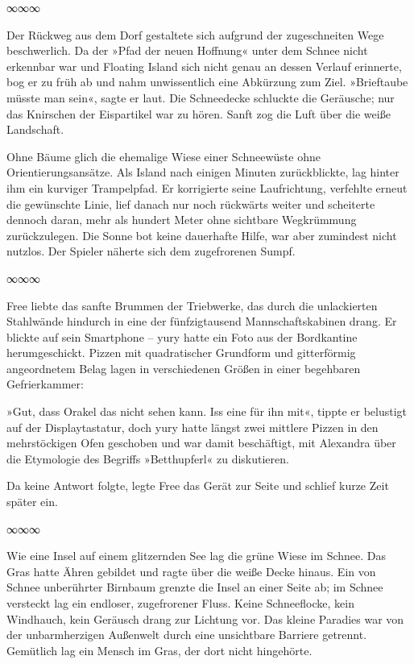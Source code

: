 \begin{center}
	∞∞∞
\end{center}

Der Rückweg aus dem Dorf gestaltete sich aufgrund der zugeschneiten Wege beschwerlich. Da der »Pfad der neuen Hoffnung« unter dem Schnee nicht erkennbar war und Floating Island sich nicht genau an dessen Verlauf erinnerte, bog er zu früh ab und nahm unwissentlich eine Abkürzung zum Ziel. »Brieftaube müsste man sein«, sagte er laut. Die Schneedecke schluckte die Geräusche; nur das Knirschen der Eispartikel war zu hören. Sanft zog die Luft über die weiße Landschaft.

Ohne Bäume glich die ehemalige Wiese einer Schneewüste ohne Orientierungsansätze. Als Island nach einigen Minuten zurückblickte, lag hinter ihm ein kurviger Trampelpfad. Er korrigierte seine Laufrichtung, verfehlte erneut die gewünschte Linie, lief danach nur noch rückwärts weiter und scheiterte dennoch daran, mehr als hundert Meter ohne sichtbare Wegkrümmung zurückzulegen. Die Sonne bot keine dauerhafte Hilfe, war aber zumindest nicht nutzlos. Der Spieler näherte sich dem zugefrorenen Sumpf.

\begin{center}
	∞∞∞
\end{center}

Free liebte das sanfte Brummen der Triebwerke, das durch die unlackierten Stahlwände hindurch in eine der fünfzigtausend Mannschaftskabinen drang. Er blickte auf sein Smartphone – yury hatte ein Foto aus der Bordkantine herumgeschickt. Pizzen mit quadratischer Grundform und gitterförmig angeordnetem Belag lagen in verschiedenen Größen in einer begehbaren Gefrierkammer: 

»Gut, dass Orakel das nicht sehen kann. Iss eine für ihn mit«, tippte er belustigt auf der Displaytastatur, doch yury hatte längst zwei mittlere Pizzen in den mehrstöckigen Ofen geschoben und war damit beschäftigt, mit Alexandra über die Etymologie des Begriffs »Betthupferl« zu diskutieren.

Da keine Antwort folgte, legte Free das Gerät zur Seite und schlief kurze Zeit später ein.

\begin{center}
	∞∞∞
\end{center}

Wie eine Insel auf einem glitzernden See lag die grüne Wiese im Schnee. Das Gras hatte Ähren gebildet und ragte über die weiße Decke hinaus.  Ein von Schnee unberührter Birnbaum grenzte die Insel an einer Seite ab; im Schnee versteckt lag ein endloser, zugefrorener Fluss. Keine Schneeflocke, kein Windhauch, kein Geräusch drang zur Lichtung vor. Das kleine Paradies war von der unbarmherzigen Außenwelt durch eine unsichtbare Barriere getrennt. Gemütlich lag ein Mensch im Gras, der dort nicht hingehörte.

